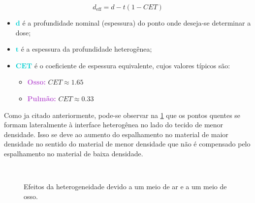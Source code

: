 \documentclass[11pt,a4paper]{article}
\newcounter{exemplo}
\begin{document}
	\begin{equation}
		d_{\text{eff}} = d - t(1 - CET)
	\end{equation}

	\begin{exemplo}
		\begin{itemize}
			\item \textcolor{DarkTurquoise}{$\mathbf{d}$} é a profundidade nominal (espessura) do ponto onde deseja-se determinar a dose;
			\item \textcolor{DarkTurquoise}{$\mathbf{t}$} é a espessura da profundidade heterogênea;
			\item \textcolor{DarkTurquoise}{$\mathbf{CET}$} é o coeficiente de espessura equivalente, cujos valores típicos são:
				\begin{itemize}[label=\textcolor{CarnationPink}{$\star$}]
					\item \textcolor{MediumOrchid}{\textbf{Osso:}} $CET \approx 1.65$
					\item \textcolor{MediumOrchid}{\textbf{Pulmão:}} $CET \approx 0.33$
				\end{itemize}
		\end{itemize}
	\end{exemplo}

	Como ja citado anteriormente, pode-se observar na \ref{fig:heterogeneidade}  que os pontos quentes se formam lateralmente à interface heterogênea no lado do tecido de menor densidade. Isso se deve ao aumento do espalhamento no material de maior densidade no sentido do material de menor densidade que não é compensado pelo espalhamento no material de baixa densidade.

	\begin{figure}[h]
		\centering
		 \\ %
		\caption{Efeitos da heterogeneidade devido a um meio de ar e a um meio de osso.}
		\label{fig:heterogeneidade}
	\end{figure}
\end{document}
